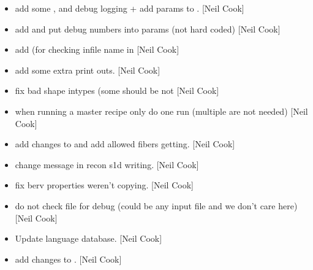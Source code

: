 \documentclass[a4paper,10pt,english]{report}
\begin{document}
\begin{itemize}
\item {} 
 \sphinxhyphen{} add some , and debug logging +
add params to . {[}Neil Cook{]}

\item {} 
 \sphinxhyphen{} add  and put debug numbers into
params (not hard coded) {[}Neil Cook{]}

\item {} 
 \sphinxhyphen{} add  (for checking infile
name in  {[}Neil Cook{]}

\item {} 
 \sphinxhyphen{} add some extra print outs. {[}Neil Cook{]}

\item {} 
 \sphinxhyphen{} fix bad shape intypes
(some should be  not  {[}Neil Cook{]}

\item {} 
 \sphinxhyphen{} when running a master recipe only do one run
(multiple are not needed) {[}Neil Cook{]}

\item {} 
 \sphinxhyphen{} add changes to  and
add allowed fibers getting. {[}Neil Cook{]}

\item {} 
 \sphinxhyphen{} change message in recon s1d writing.
{[}Neil Cook{]}

\item {} 
 \sphinxhyphen{} fix berv \sphinxhyphen{} properties weren’t copying. {[}Neil
Cook{]}

\item {} 
 \sphinxhyphen{} do not check file for debug (could be
any input file and we don’t care here) {[}Neil Cook{]}

\item {} 
Update language database. {[}Neil Cook{]}

\item {} 
 \sphinxhyphen{} add changes to .
{[}Neil Cook{]}


\end{itemize}
\end{document}
